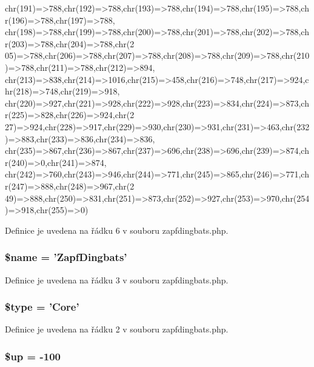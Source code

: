 \begin{DoxyCode}
      chr(191)=>788,chr(192)=>788,chr(193)=>788,chr(194)=>788,chr(195)=>788,chr(196)=>788,chr(197)=>788,
    chr(198)=>788,chr(199)=>788,chr(200)=>788,chr(201)=>788,chr(202)=>788,chr(203)=>788,chr(204)=>788,chr(2
      05)=>788,chr(206)=>788,chr(207)=>788,chr(208)=>788,chr(209)=>788,chr(210)=>788,chr(211)=>788,chr(212)=>894,
      chr(213)=>838,chr(214)=>1016,chr(215)=>458,chr(216)=>748,chr(217)=>924,chr(218)=>748,chr(219)=>918,
    chr(220)=>927,chr(221)=>928,chr(222)=>928,chr(223)=>834,chr(224)=>873,chr(225)=>828,chr(226)=>924,chr(2
      27)=>924,chr(228)=>917,chr(229)=>930,chr(230)=>931,chr(231)=>463,chr(232)=>883,chr(233)=>836,chr(234)=>836,
      chr(235)=>867,chr(236)=>867,chr(237)=>696,chr(238)=>696,chr(239)=>874,chr(240)=>0,chr(241)=>874,
    chr(242)=>760,chr(243)=>946,chr(244)=>771,chr(245)=>865,chr(246)=>771,chr(247)=>888,chr(248)=>967,chr(2
      49)=>888,chr(250)=>831,chr(251)=>873,chr(252)=>927,chr(253)=>970,chr(254)=>918,chr(255)=>0)
\end{DoxyCode}


Definice je uvedena na řádku 6 v souboru zapfdingbats.\-php.

\hypertarget{zapfdingbats_8php_ab2fc40d43824ea3e1ce5d86dee0d763b}{
\subsubsection[{\$name}]{\setlength{\rightskip}{0pt plus 5cm}\$name = 'Zapf\-Dingbats'}}\label{zapfdingbats_8php_ab2fc40d43824ea3e1ce5d86dee0d763b}


Definice je uvedena na řádku 3 v souboru zapfdingbats.\-php.

\hypertarget{zapfdingbats_8php_a9a4a6fba2208984cabb3afacadf33919}{
\subsubsection[{\$type}]{\setlength{\rightskip}{0pt plus 5cm}\$type = 'Core'}}\label{zapfdingbats_8php_a9a4a6fba2208984cabb3afacadf33919}


Definice je uvedena na řádku 2 v souboru zapfdingbats.\-php.

\hypertarget{zapfdingbats_8php_a6b5ad2ac55f9df46e8f34e78fbd6f176}{
\subsubsection[{\$up}]{\setlength{\rightskip}{0pt plus 5cm}\$up = -\/100}}\label{zapfdingbats_8php_a6b5ad2ac55f9df46e8f34e78fbd6f176}


